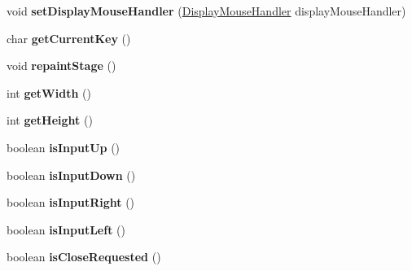 \begin{DoxyCompactItemize}
\item 
\mbox{\label{classde_1_1me_1_1edgelord_1_1sjgl_1_1display_1_1_display_manager_a1b5a20de321735aba8c8ad4046da2667}} 
void {\bfseries set\+Display\+Mouse\+Handler} (\mbox{\hyperlink{interfacede_1_1me_1_1edgelord_1_1sjgl_1_1input_1_1_display_mouse_handler}{Display\+Mouse\+Handler}} display\+Mouse\+Handler)
\item 
\mbox{\label{classde_1_1me_1_1edgelord_1_1sjgl_1_1display_1_1_display_manager_ad059deb6fc2fa140f16b66c6ecc78211}} 
char {\bfseries get\+Current\+Key} ()
\item 
\mbox{\label{classde_1_1me_1_1edgelord_1_1sjgl_1_1display_1_1_display_manager_abeb35576ab357b1c7b1225e29ef78da8}} 
void {\bfseries repaint\+Stage} ()
\item 
\mbox{\label{classde_1_1me_1_1edgelord_1_1sjgl_1_1display_1_1_display_manager_ac0da281cdea7eb33e8a7d3d9bf6b4466}} 
int {\bfseries get\+Width} ()
\item 
\mbox{\label{classde_1_1me_1_1edgelord_1_1sjgl_1_1display_1_1_display_manager_a46c9ba8f9f651d09cb2b26735dea25f0}} 
int {\bfseries get\+Height} ()
\item 
\mbox{\label{classde_1_1me_1_1edgelord_1_1sjgl_1_1display_1_1_display_manager_a2aac593a1d00be7b1731de2bc3965eea}} 
boolean {\bfseries is\+Input\+Up} ()
\item 
\mbox{\label{classde_1_1me_1_1edgelord_1_1sjgl_1_1display_1_1_display_manager_a4d3b864aa85ef8505b639ae50fc8d827}} 
boolean {\bfseries is\+Input\+Down} ()
\item 
\mbox{\label{classde_1_1me_1_1edgelord_1_1sjgl_1_1display_1_1_display_manager_a934a709c13e798b4203903e771b78c42}} 
boolean {\bfseries is\+Input\+Right} ()
\item 
\mbox{\label{classde_1_1me_1_1edgelord_1_1sjgl_1_1display_1_1_display_manager_ab453fc44120a09fcab4925092955b585}} 
boolean {\bfseries is\+Input\+Left} ()
\item 
\mbox{\label{classde_1_1me_1_1edgelord_1_1sjgl_1_1display_1_1_display_manager_a1021987d28e34f29b49e63c2138f0b60}} 
boolean {\bfseries is\+Close\+Requested} ()
\end{DoxyCompactItemize}


